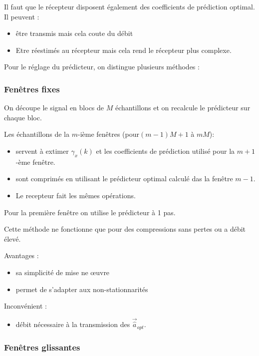 \documentclass[main.tex]{subfiles}
\begin{document}
Il faut que le récepteur disposent également des coefficients de prédiction optimal. Il peuvent :
\begin{itemize}
\item être transmis mais cela coute du débit
\item Etre réestimés au récepteur mais cela rend le récepteur plus complexe.
\end{itemize}
Pour le réglage du prédicteur, on distingue plusieurs méthodes :

\subsubsection{Fenêtres fixes}

  On découpe le signal en blocs de $M$ échantillons et on recalcule le prédicteur sur chaque bloc.

  Les échantillons de la $m$-ième fenêtres (pour$(m-1)M+1$ à $mM$):
  \begin{itemize}
  \item servent à extimer $\hat{\gamma}_x(k)$ et les coefficients de prédiction utilisé pour la $m+1$-ème fenêtre.
  \item sont comprimés en utilisant le prédicteur optimal calculé das la fenêtre $m-1$.
  \item Le recepteur fait les mêmes opérations.
  \end{itemize}
  \begin{rem}
    Pour la première fenêtre  on utilise le prédicteur à 1 pas.

    Cette méthode ne fonctionne que pour des compressions sans pertes ou  a débit élevé.
  \end{rem}
  Avantages :
  \begin{itemize}
  \item sa simplicité de mise ne œuvre
  \item permet de s'adapter aux non-stationnarités
  \end{itemize}
  Inconvénient :
  \begin{itemize}
  \item débit nécessaire à la transmission des $\vec{\hat{a}}_{opt}$.
  \end{itemize}

\subsubsection{Fenêtres glissantes}
\end{document}
